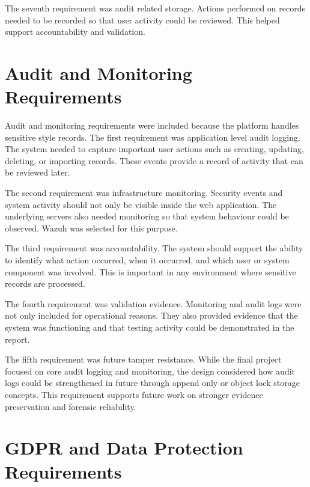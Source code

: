 The seventh requirement was audit related storage. Actions performed on records needed to be recorded so that user activity could be reviewed. This helped support accountability and validation.


\section{Audit and Monitoring Requirements}

Audit and monitoring requirements were included because the platform handles sensitive style records. The first requirement was application level audit logging. The system needed to capture important user actions such as creating, updating, deleting, or importing records. These events provide a record of activity that can be reviewed later.

The second requirement was infrastructure monitoring. Security events and system activity should not only be visible inside the web application. The underlying servers also needed monitoring so that system behaviour could be observed. Wazuh was selected for this purpose.

The third requirement was accountability. The system should support the ability to identify what action occurred, when it occurred, and which user or system component was involved. This is important in any environment where sensitive records are processed.

The fourth requirement was validation evidence. Monitoring and audit logs were not only included for operational reasons. They also provided evidence that the system was functioning and that testing activity could be demonstrated in the report.

The fifth requirement was future tamper resistance. While the final project focused on core audit logging and monitoring, the design considered how audit logs could be strengthened in future through append only or object lock storage concepts. This requirement supports future work on stronger evidence preservation and forensic reliability.


\section{GDPR and Data Protection Requirements}

